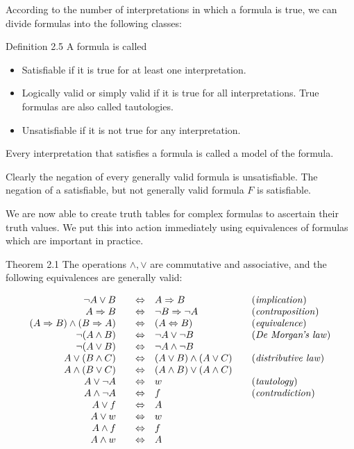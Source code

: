 \documentclass[10pt]{book}
\begin{document}
According to the number of interpretations in which a formula is true, we can divide formulas into the following classes:

Definition 2.5 A formula is called

\begin{itemize}
  \item Satisfiable if it is true for at least one interpretation.
  \item Logically valid or simply valid if it is true for all interpretations. True formulas are also called tautologies.
  \item Unsatisfiable if it is not true for any interpretation.
\end{itemize}

Every interpretation that satisfies a formula is called a model of the formula.

Clearly the negation of every generally valid formula is unsatisfiable. The negation of a satisfiable, but not generally valid formula $F$ is satisfiable.

We are now able to create truth tables for complex formulas to ascertain their truth values. We put this into action immediately using equivalences of formulas which are important in practice.

Theorem 2.1 The operations $\wedge, \vee$ are commutative and associative, and the following equivalences are generally valid:

$$
\begin{array}{rlrlrl}
\neg A \vee B & & \Leftrightarrow & A \Rightarrow B & & \text{(\textit{implication})} \\
A \Rightarrow B & & \Leftrightarrow & \neg B \Rightarrow \neg A & & \text{(\textit{contraposition})} \\
(A \Rightarrow B) \wedge (B \Rightarrow A) & & \Leftrightarrow & (A \Leftrightarrow B) & & \text{(\textit{equivalence})} \\
\neg(A \wedge B) & & \Leftrightarrow & \neg A \vee \neg B & & \text{(\textit{De Morgan's law})} \\
\neg(A \vee B) & & \Leftrightarrow & \neg A \wedge \neg B & & \\
A \vee (B \wedge C) & & \Leftrightarrow & (A \vee B) \wedge (A \vee C) & & \text{(\textit{distributive law})} \\
A \wedge (B \vee C) & & \Leftrightarrow & (A \wedge B) \vee (A \wedge C) & & \\
A \vee \neg A & & \Leftrightarrow & w & & \text{(\textit{tautology})} \\
A \wedge \neg A & & \Leftrightarrow & f & & \text{(\textit{contradiction})} \\
A \vee f & & \Leftrightarrow & A & & \\
A \vee w & & \Leftrightarrow & w & & \\
A \wedge f & & \Leftrightarrow & f & & \\
A \wedge w & & \Leftrightarrow & A & &
\end{array}
$$
\end{document}
